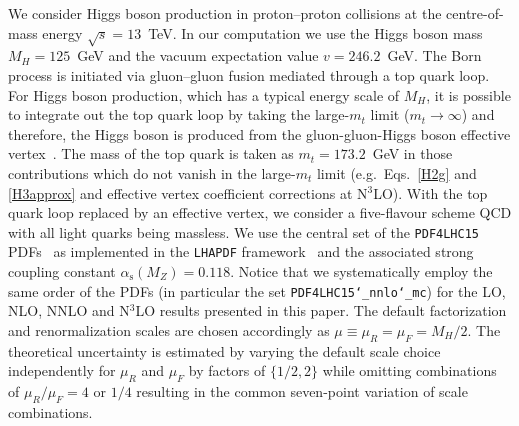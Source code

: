\documentclass[12pt]{article}
\DeclareRobustCommand{\as}{\ensuremath{\alpha_{\mathrm{s}}}}
\begin{document}
We consider Higgs boson production in proton--proton collisions at the centre-of-mass energy $\sqrt{s}=13$~TeV. In our computation we use the Higgs boson mass  $M_H= 125$~GeV and the vacuum expectation value  $v=246.2$~GeV. The Born process is initiated via gluon--gluon fusion mediated through a top quark loop. For Higgs boson production, which has a typical energy scale of $M_H$, it is possible to integrate out the top quark loop by taking the large-$m_t$ limit ($m_{t}\rightarrow \infty$) and therefore, the Higgs boson is produced from the gluon-gluon-Higgs boson effective vertex~\cite{Heft}. The mass of the top quark is taken as $m_t = 173.2$~GeV in those contributions which do not vanish in the large-$m_t$ limit (e.g.\  Eqs.~\eqref{H2g} and \eqref{H3approx} and effective vertex coefficient corrections at N$^3$LO). With the top quark loop replaced by an effective vertex, we consider a five-flavour scheme QCD with all light quarks being massless. We use the central set of the \texttt{PDF4LHC15} PDFs~\cite{nnpdf} as implemented in the \texttt{LHAPDF} framework~\cite{Buckley:2014ana} and the associated strong coupling constant $\as(M_Z)=0.118$. Notice that we systematically employ the same order of the PDFs (in particular the set \texttt{PDF4LHC15\char`_nnlo\char`_mc}) for the LO, NLO, NNLO and N$^{3}$LO results presented in this paper. The default factorization and renormalization scales are chosen accordingly as $\mu \equiv \mu_R = \mu_F =  M_H / 2$. The theoretical uncertainty is estimated by varying the default scale choice independently for $\mu_R$ and $\mu_F$ by factors of $\{1/2,2\}$ while omitting combinations of $\mu_R/\mu_F = 4$ or $1/4$ resulting in the common seven-point variation of scale combinations. 
\end{document}
